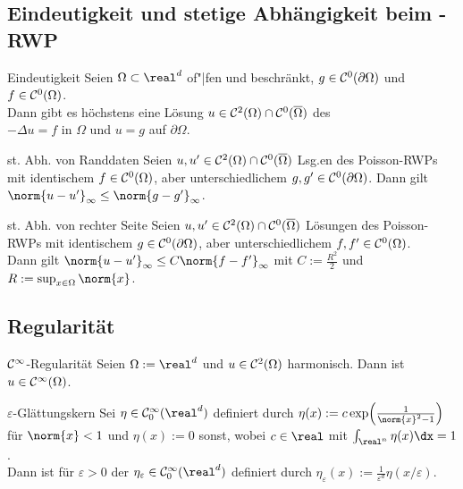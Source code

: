\subsection{%
    Eindeutigkeit und stetige Abhängigkeit beim -RWP%
}

\begin{Satz}{Eindeutigkeit}
    Seien $\Omega \subset \real^d$ of"|fen und beschränkt, $g \in \mathcal{C}^0(\partial\Omega)$ und
    $f \in \mathcal{C}^0(\Omega)$.\\
    Dann gibt es höchstens eine Lösung $u \in \mathcal{C}^2(\Omega) \cap \mathcal{C}^0(\overline{\Omega})$ des
    \\
    $-\Delta u = f$ in $\Omega$ und $u = g$ auf $\partial\Omega$.
\end{Satz}

\linie

\begin{Satz}{st. Abh. von Randdaten}
    Seien $u, u' \in \mathcal{C}^2(\Omega) \cap \mathcal{C}^0(\overline{\Omega})$ Lsg.en des Poisson-RWPs
    mit identischem $f \in \mathcal{C}^0(\Omega)$, aber unterschiedlichem $g, g' \in \mathcal{C}^0(\partial\Omega)$.
    Dann gilt $\norm{u - u'}_\infty \le \norm{g - g'}_\infty$.
\end{Satz}

\begin{Satz}{st. Abh. von rechter Seite}
    Seien $u, u' \in \mathcal{C}^2(\Omega) \cap \mathcal{C}^0(\overline{\Omega})$ Lösungen des Poisson-RWPs
    mit identischem
    $g \in \mathcal{C}^0(\partial\Omega)$, aber unterschiedlichem
    $f, f' \in \mathcal{C}^0(\Omega)$.\\
    Dann gilt $\norm{u - u'}_\infty \le C \norm{f - f'}_\infty$
    mit $C := \frac{R^2}{2}$ und $R := \sup_{x \in \Omega} \norm{x}$.
\end{Satz}

\subsection{%
    Regularität%
}

\begin{Satz}{$\mathcal{C}^\infty$-Regularität}
    Seien $\Omega := \real^d$ und $u \in \mathcal{C}^2(\Omega)$ harmonisch.
    Dann ist $u \in \mathcal{C}^\infty(\Omega)$.
\end{Satz}

\linie

\begin{Def}{$\varepsilon$-Glättungskern}
    Sei $\eta \in \C^\infty_0(\real^d)$ definiert durch
    $\eta(x) := c \exp\!\left(\frac{1}{\norm{x}^2 - 1}\right)$ für $\norm{x} < 1$ und
    $\eta(x) := 0$ sonst, wobei $c \in \real$ mit $\int_{\real^n} \eta(x) \dx = 1$.\\
    Dann ist für $\varepsilon > 0$ der 
    $\eta_\varepsilon \in \C^\infty_0(\real^d)$ definiert durch
    $\eta_\varepsilon(x) := \frac{1}{\varepsilon^d} \eta(x/\varepsilon)$.
\end{Def}

